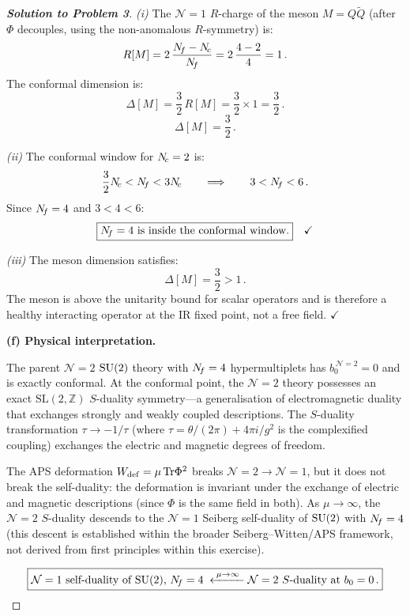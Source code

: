 \documentclass[11pt,a4paper]{article}
\begin{document}
\begin{proof}[\textbf{Solution to Problem 3}]
\textit{(i)} The $\mathcal{N}=1$ $R$-charge of the meson
$M = Q\widetilde{Q}$ (after $\Phi$ decouples, using the non-anomalous
$R$-symmetry) is:
\[
  R[M] = 2\,\frac{N_{\!f} - N_{\!c}}{N_{\!f}}
  = 2\,\frac{4 - 2}{4} = 1\,.
\]
The conformal dimension is:
\[
  \Delta[M] = \frac{3}{2}\,R[M] = \frac{3}{2} \times 1
  = \frac{3}{2}\,.
\]
\[
  \boxed{\Delta[M] = \frac{3}{2}\,.}
\]

\textit{(ii)} The conformal window for $N_{\!c} = 2$ is:
\[
  \frac{3}{2}N_{\!c} < N_{\!f} < 3N_{\!c}
  \qquad\Longrightarrow\qquad
  3 < N_{\!f} < 6\,.
\]
Since $N_{\!f} = 4$ and $3 < 4 < 6$:
\[
  \boxed{N_{\!f} = 4 \text{ is inside the conformal window.}}
  \quad\checkmark
\]

\textit{(iii)} The meson dimension satisfies:
\[
  \Delta[M] = \frac{3}{2} > 1\,.
\]
The meson is above the unitarity bound for scalar operators and is
therefore a healthy interacting operator at the IR fixed point, not a
free field.
\quad$\checkmark$

\bigskip

\textbf{(f) Physical interpretation.}

The parent $\mathcal{N}=2$ $\mathrm{SU}(2)$ theory with $N_{\!f} = 4$
hypermultiplets has $b_0^{\,\mathcal{N}=2} = 0$ and is exactly
conformal.  At the conformal point, the $\mathcal{N}=2$ theory possesses
an exact $\mathrm{SL}(2,\mathbb{Z})$ $S$-duality symmetry---a
generalisation of electromagnetic duality that exchanges strongly and
weakly coupled descriptions.  The $S$-duality transformation
$\tau \to -1/\tau$ (where $\tau = \theta/(2\pi) + 4\pi i/g^2$ is
the complexified coupling) exchanges the electric and magnetic degrees
of freedom.

The APS deformation $W_{\mathrm{def}} = \mu\,\mathrm{Tr}\Phi^2$ breaks
$\mathcal{N}=2 \to \mathcal{N}=1$, but it does not break the
self-duality: the deformation is invariant under the exchange of
electric and magnetic descriptions (since $\Phi$ is the same field in
both).  As $\mu \to \infty$, the $\mathcal{N}=2$ $S$-duality descends
to the $\mathcal{N}=1$ Seiberg self-duality of $\mathrm{SU}(2)$ with $N_{\!f} = 4$
(this descent is established within the broader Seiberg--Witten/APS framework, not derived from first principles within this exercise).

\[
  \boxed{
  \text{$\mathcal{N}=1$ self-duality of $\mathrm{SU}(2)$, $N_{\!f} = 4$}
  \;\xleftarrow{\;\mu \to \infty\;}
  \text{$\mathcal{N}=2$ $S$-duality at $b_0 = 0$}\,.}
\]

\end{proof}

\bigskip
\end{document}
